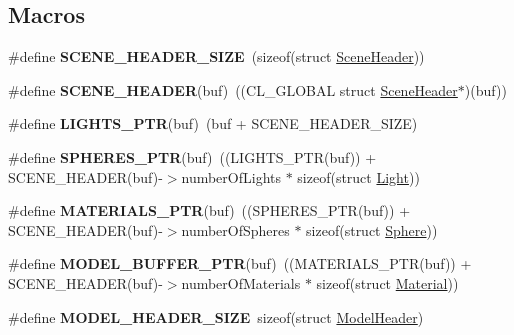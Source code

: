 \subsection*{Macros}
\begin{DoxyCompactItemize}
\item 
\#define {\bfseries S\+C\+E\+N\+E\+\_\+\+H\+E\+A\+D\+E\+R\+\_\+\+S\+I\+ZE}~(sizeof(struct \hyperlink{struct_scene_header}{Scene\+Header}))\hypertarget{group__g13_ga38a381d14622fcc59c6d3f07a258c036}{}\label{group__g13_ga38a381d14622fcc59c6d3f07a258c036}

\item 
\#define {\bfseries S\+C\+E\+N\+E\+\_\+\+H\+E\+A\+D\+ER}(buf)~((C\+L\+\_\+\+G\+L\+O\+B\+AL struct \hyperlink{struct_scene_header}{Scene\+Header}$\ast$)(buf))\hypertarget{group__g13_ga1e3e4c054d65f47dc9a34ce0ced401d8}{}\label{group__g13_ga1e3e4c054d65f47dc9a34ce0ced401d8}

\item 
\#define {\bfseries L\+I\+G\+H\+T\+S\+\_\+\+P\+TR}(buf)~(buf + S\+C\+E\+N\+E\+\_\+\+H\+E\+A\+D\+E\+R\+\_\+\+S\+I\+ZE)\hypertarget{group__g13_gafbc9f83ffa828eb13e760b4f8811f409}{}\label{group__g13_gafbc9f83ffa828eb13e760b4f8811f409}

\item 
\#define {\bfseries S\+P\+H\+E\+R\+E\+S\+\_\+\+P\+TR}(buf)~((L\+I\+G\+H\+T\+S\+\_\+\+P\+TR(buf)) + S\+C\+E\+N\+E\+\_\+\+H\+E\+A\+D\+ER(buf)-\/$>$number\+Of\+Lights $\ast$ sizeof(struct \hyperlink{struct_light}{Light}))\hypertarget{group__g13_ga73d0d12e51e12bd2fec5df7a62bd963f}{}\label{group__g13_ga73d0d12e51e12bd2fec5df7a62bd963f}

\item 
\#define {\bfseries M\+A\+T\+E\+R\+I\+A\+L\+S\+\_\+\+P\+TR}(buf)~((S\+P\+H\+E\+R\+E\+S\+\_\+\+P\+TR(buf)) + S\+C\+E\+N\+E\+\_\+\+H\+E\+A\+D\+ER(buf)-\/$>$number\+Of\+Spheres $\ast$ sizeof(struct \hyperlink{struct_sphere}{Sphere}))\hypertarget{group__g13_ga4e5ffb47ecb2614e64d3a2978209c88d}{}\label{group__g13_ga4e5ffb47ecb2614e64d3a2978209c88d}

\item 
\#define {\bfseries M\+O\+D\+E\+L\+\_\+\+B\+U\+F\+F\+E\+R\+\_\+\+P\+TR}(buf)~((M\+A\+T\+E\+R\+I\+A\+L\+S\+\_\+\+P\+TR(buf)) + S\+C\+E\+N\+E\+\_\+\+H\+E\+A\+D\+ER(buf)-\/$>$number\+Of\+Materials $\ast$ sizeof(struct \hyperlink{struct_material}{Material}))\hypertarget{group__g13_ga31544aa778e216b3c9ab44a81b665b97}{}\label{group__g13_ga31544aa778e216b3c9ab44a81b665b97}

\item 
\#define {\bfseries M\+O\+D\+E\+L\+\_\+\+H\+E\+A\+D\+E\+R\+\_\+\+S\+I\+ZE}~sizeof(struct \hyperlink{struct_model_header}{Model\+Header})\hypertarget{group__g13_ga3fe91a9d0fea3f5d60f0d356ab4499fe}{}\label{group__g13_ga3fe91a9d0fea3f5d60f0d356ab4499fe}


\end{DoxyCompactItemize}

